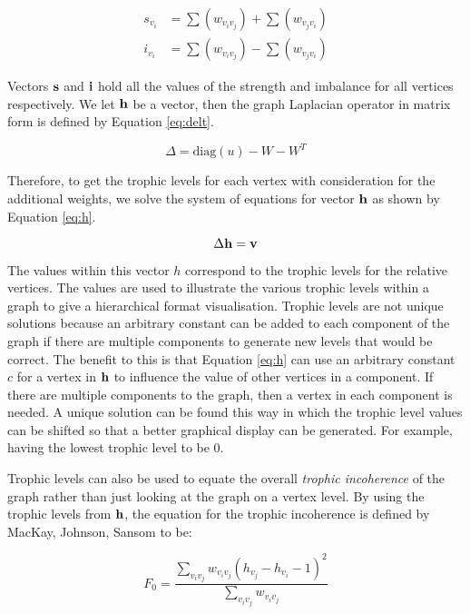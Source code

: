 \begin{align}
s_{v_i} &= \sum(w_{v_iv_j}) + \sum(w_{v_jv_i}) \label{eq:strength} \\
i_{v_i} &= \sum(w_{v_iv_j}) - \sum(w_{v_jv_i}) \label{eq:imb}
\end{align}

Vectors $\bold{s}$ and $\bold{i}$ hold all the values of the strength and imbalance for all vertices respectively. We let $\bold{h}$ be a vector, then the graph Laplacian operator in matrix form is defined by Equation \ref{eq:delt}.  

\begin{equation} \label{eq:delt}
\Delta = \text{diag}(u) - W - W^T
\end{equation}

Therefore, to get the trophic levels for each vertex with consideration for the additional weights, we solve the system of equations for vector $\bold{h}$ as shown by Equation \ref{eq:h}.

\begin{equation} \label{eq:h}
\Delta \bold{h} = \bold{v} 
\end{equation}

The values within this vector $h$ correspond to the trophic levels for the relative vertices. The values are used to illustrate the various trophic levels within a graph to give a hierarchical format visualisation. Trophic levels are not unique solutions because an arbitrary constant can be added to each component of the graph if there are multiple components to generate new levels that would be correct. The benefit to this is that Equation \ref{eq:h} can use an arbitrary constant $c$ for a vertex in $\bold{h}$ to influence the value of other vertices in a component. If there are multiple components to the graph, then a vertex in each component is needed. A unique solution can be found this way in which the trophic level values can be shifted so that a better graphical display can be generated. For example, having the lowest trophic level to be 0. 

Trophic levels can also be used to equate the overall \emph{trophic incoherence} of the graph rather than just looking at the graph on a vertex level. By using the trophic levels from $\bold{h}$, the equation for the trophic incoherence is defined by MacKay, Johnson, Sansom \cite{johnson2020digraphs} to be:

\begin{equation}
F_0=\frac{\sum_{v_iv_j}w_{v_iv_j}(h_{v_j}-h_{v_i}-1)^2}{\sum_{v_iv_j}w_{v_iv_j}}
\end{equation}

